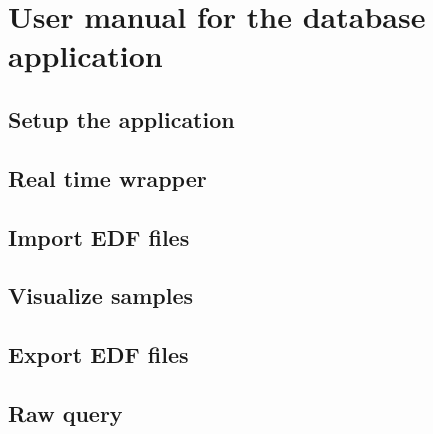 
\chapter{User manual for the database application}
\label{AppendixA}
\section{Setup the application}
\section{Real time wrapper}
\section{Import EDF files}
\section{Visualize samples}
\section{Export EDF files}
\section{Raw query}